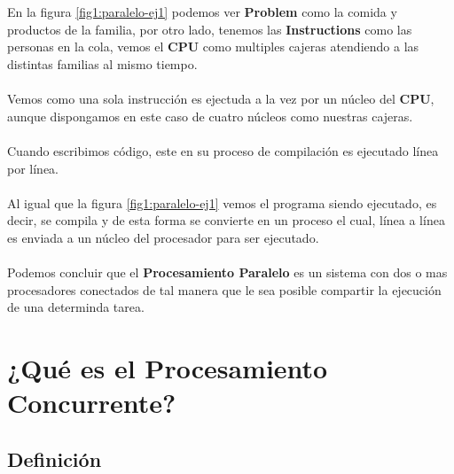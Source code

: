 \documentclass[a4paper]{report} %
\begin{document}
              \\\\En la figura \ref{fig1:paralelo-ej1} podemos ver \textbf {Problem} como la comida y productos de la familia, por otro lado, tenemos las \textbf{Instructions} como las personas en la cola, vemos el \textbf{CPU} como multiples cajeras atendiendo a las distintas familias al mismo tiempo.
              \\\\Vemos como una sola instrucción es ejectuda a la vez por un núcleo del \textbf{CPU}, aunque dispongamos en este caso de cuatro núcleos como nuestras cajeras.
              \\\\Cuando escribimos código, este en su proceso de compilación es ejecutado línea por línea.
              \\\\Al igual que la figura \ref{fig1:paralelo-ej1} vemos el programa siendo ejecutado, es decir, se compila y de esta forma se convierte en un proceso el cual, línea a línea es enviada a un núcleo del procesador para ser ejecutado.
              \\\\Podemos concluir que el \textbf{Procesamiento Paralelo} es un sistema con dos o mas procesadores conectados de tal manera que le sea posible compartir la ejecución de una determinda tarea.
        \section{¿Qué es el Procesamiento Concurrente?}
          \subsection{Definición}
\end{document}
